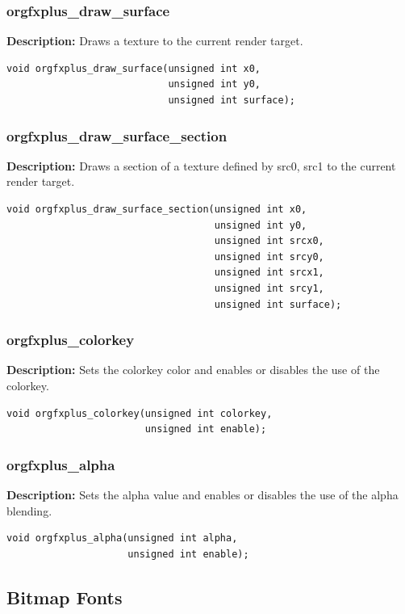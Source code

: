\documentclass[10pt,a4paper]{article}
\begin{document}
\subsubsection{orgfxplus\_draw\_surface}
\textbf{Description:} Draws a texture to the current render target.
\begin{lstlisting}
void orgfxplus_draw_surface(unsigned int x0,
                            unsigned int y0,
                            unsigned int surface);
\end{lstlisting}

\subsubsection{orgfxplus\_draw\_surface\_section}
\textbf{Description:} Draws a section of a texture defined by src0, src1 to the current render target.
\begin{lstlisting}
void orgfxplus_draw_surface_section(unsigned int x0,
                                    unsigned int y0,
                                    unsigned int srcx0,
                                    unsigned int srcy0,
                                    unsigned int srcx1,
                                    unsigned int srcy1,
                                    unsigned int surface);
\end{lstlisting}


\subsubsection{orgfxplus\_colorkey}
\textbf{Description:} Sets the colorkey color and enables or disables the use of the colorkey.
\begin{lstlisting}
void orgfxplus_colorkey(unsigned int colorkey, 
                        unsigned int enable);
\end{lstlisting}

\subsubsection{orgfxplus\_alpha}
\textbf{Description:} Sets the alpha value and enables or disables the use of the alpha blending.
\begin{lstlisting}
void orgfxplus_alpha(unsigned int alpha, 
                     unsigned int enable);
\end{lstlisting}

\subsection{Bitmap Fonts}
\end{document}
